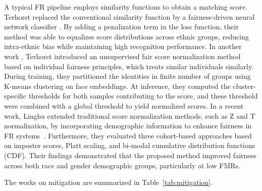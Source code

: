 A typical FR pipeline employs similarity functions to obtain a matching score.
Terhorst \etal  replaced the conventional similarity function by a
fairness-driven neural network classifier \cite{terhorst2020comparison}. By
adding a penalization term in the loss function, their method was able to
equalizes score distributions across ethnic groups, reducing intra-ethnic bias
while maintaining high recognition performance. 
%
In another work \cite{terhorst2020post}, Terhorst \etal introduced an
unsupervised fair score normalization method based on individual fairness
principles, which treats similar individuals similarly. During training, they
partitioned the identities in finite number of groups using K-means clustering
on face embeddings. At inference, they computed the cluster-specific
thresholds for both samples contributing to the score, and  these threshold
were combined with a global threshold to yield normalized scores.
%
In a recent work, Linghu \etal extended traditional score normalization
methods, such as Z and T normalization, by incorporating demographic
information to enhance fairness in FR systems~\cite{linghu2024ijcb}.
Furthermore, they evaluated three cohort-based approaches based on imposter
scores, Platt scaling, and bi-modal cumulative distribution functions (CDF).
Their findings demonstrated that the proposed method improved fairness across
both race and gender demographic groups, particularly at low FMRs.

The works on mitigation are summarized in Table~\ref{tab:mitigation}.


